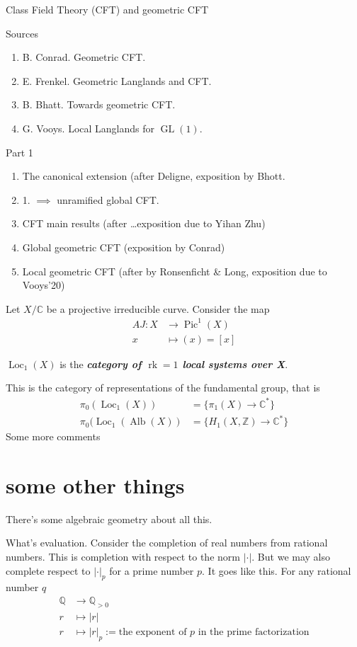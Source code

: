 \documentclass{article}
\numberwithin{equation}{section}
\newcommand{\Z}{\mathbb{Z}}
\newcommand{\C}{\mathbb{C}}
\newcommand{\Q}{\mathbb{Q}}
\DeclareMathOperator{\GL}{GL}
\DeclareMathOperator{\Pic}{Pic}
\DeclareMathOperator{\Loc}{Loc}
\DeclareMathOperator{\Alb}{Alb}
\DeclareMathOperator{\rk}{rk}
\begin{document}
	{\Large Class Field Theory (CFT) and geometric CFT}

	Sources
\begin{enumerate}
	\item B. Conrad. Geometric CFT.
	\item E. Frenkel. Geometric Langlands and CFT.
	\item B. Bhatt. Towards geometric CFT.
	\item G. Vooys. Local Langlands for $\GL(1)$.
\end{enumerate}

Part 1
\begin{enumerate}
	\item The canonical extension (after Deligne, exposition by Bhott.
	\item 1. $\implies$ unramified global CFT.
	\item CFT main results (after \ldots exposition due to Yihan Zhu)
	\item Global geometric CFT (exposition by Conrad)
	\item Local geometric CFT (after by Ronsenficht \& Long, exposition due to Vooys'20)
\end{enumerate}

Let $X/\C$ be a projective irreducible curve. Consider the map
\begin{align*}
	AJ:X  &\longrightarrow \Pic^1(X) \\
	x &\longmapsto (x) = [x]
\end{align*}
\begin{definition}
$\Loc_1(X)$ is the \textit{\textbf{category of $\rk=1$ local systems over X}}. 	
\end{definition}
This is the category of representations of the fundamental group, that is
\begin{align*}
	\pi_0(\Loc_1(X))&=\{\pi_1(X)\to \C^*\}\\
	\pi_0(\Loc_1(\Alb(X))&=\{H_1(X,\Z)\to \C^*\} 
\end{align*}
Some more comments

\section{some other things}

There's some algebraic geometry about all this. 

What's evaluation. Consider the completion of real numbers from rational numbers. This is completion with respect to the norm $|\cdot|$. But we may also complete respect to $|\cdot|_p$ for a prime number $p$. It goes like this. For any rational number $q$ 
	\begin{align*}
		\Q &\longrightarrow \Q_{>0} \\
		r &\longmapsto |r|\\
		r &\longmapsto |r|_p:=\text{the exponent of $p$ in the prime factorization}
	\end{align*}
\end{document}
